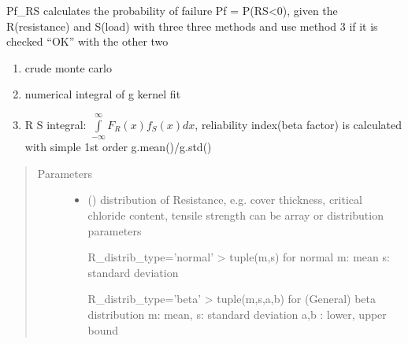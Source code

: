 \documentclass[letterpaper,10pt,english]{sphinxmanual}
\begin{document}

\begin{fulllineitems}
\label{\detokenize{helper_func:helper_func.Pf_RS}}
\sphinxAtStartPar
Pf\_RS calculates the probability of failure  Pf = P(R\sphinxhyphen{}S\textless{}0), given the R(resistance) and S(load)
with three three methods and use method 3 if it is checked “OK” with the other two
\begin{enumerate}
%
\item {} 
\sphinxAtStartPar
crude monte carlo

\item {} 
\sphinxAtStartPar
numerical integral of g kernel fit

\item {} 
\sphinxAtStartPar
R S integral: \(\int\limits_{-\infty}^{\infty} F_R(x)f_S(x)dx\), reliability index(beta factor) is calculated with simple 1st order g.mean()/g.std()

\end{enumerate}
\begin{quote}\begin{description}
\item[{Parameters}] \leavevmode\begin{itemize}
\item {} 
\sphinxAtStartPar
{} (\sphinxstyleliteralemphasis{\sphinxupquote{, }}) \textendash{} 
\sphinxAtStartPar
distribution of Resistance, e.g. cover thickness, critical chloride content, tensile strength
can be array or distribution parameters

\sphinxAtStartPar
R\_distrib\_type=’normal’ \sphinxhyphen{}\textgreater{} tuple(m,s) for normal m: mean s: standard deviation

\sphinxAtStartPar
R\_distrib\_type=’beta’ \sphinxhyphen{}\textgreater{} tuple(m,s,a,b) for (General) beta distribution
m: mean, s: standard deviation a,b : lower, upper bound


\end{itemize}
\end{description}
\end{quote}
\end{fulllineitems}
\end{document}
